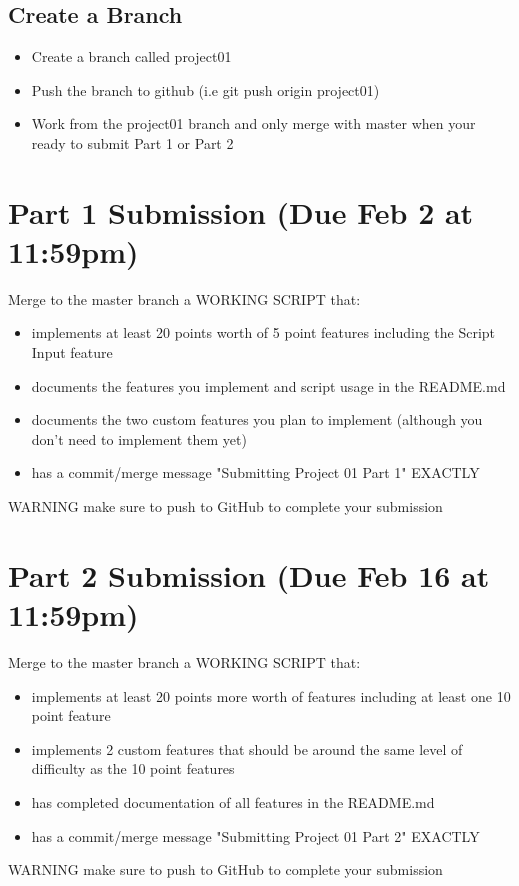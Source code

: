 \documentclass{article}
\begin{document}
\subsection{Create a Branch}
\label{sec:org5ec3048}
\begin{itemize}
\item Create a branch called {\color{purple}project01}
\item Push the branch to github (i.e {\color{purple}git push origin project01})
\item Work from the {\color{purple}project01} branch and {\color{red}only merge with master when your ready to submit Part 1 or Part 2}
\end{itemize}

\section{Part 1 Submission (Due Feb 2 at 11:59pm)}
\label{sec:org20408d2}
Merge to the master branch a {\color{purple}WORKING SCRIPT} that:
\begin{itemize}
\item implements at least {\color{purple}20 points} worth of {\color{purple}5 point} features including the
{\color{purple}Script Input} feature
\item documents the features you implement and script usage in the {\color{purple}README.md}
\item documents the {\color{purple}two custom features} you plan to implement (although you
don't need to implement them yet)
\item has a commit/merge message {\color{olive}"Submitting Project 01 Part 1"} {\color{purple}EXACTLY}
\end{itemize}
{\color{red}WARNING} make sure to push to GitHub to complete your submission 

\section{Part 2 Submission (Due Feb 16 at 11:59pm)}
\label{sec:org6a76171}
Merge to the master branch a {\color{purple}WORKING SCRIPT} that:
\begin{itemize}
\item implements at least {\color{purple}20 points} more worth of features
including {\color{purple}at least one 10 point feature}
\item implements {\color{purple}2 custom features} that should be around the same level of
difficulty as the {\color{purple}10 point features}
\item has completed documentation of all features in the {\color{purple}README.md}
\item has a commit/merge message {\color{olive}"Submitting Project 01 Part 2"} {\color{purple}EXACTLY}
\end{itemize}
{\color{red}WARNING} make sure to push to GitHub to complete your submission
\end{document}

